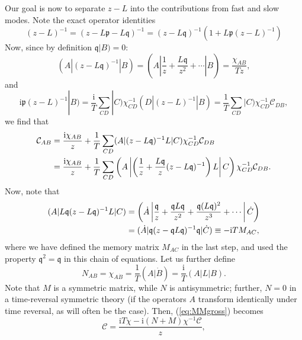 \documentclass[10pt, oneside]{book}
\begin{document}
\begin{doublespace}
Our goal is now to separate $z-L$ into the contributions from fast and slow modes.   Note the exact operator identities \begin{equation}
(z-L)^{-1} = (z-L\mathfrak{p}-L\mathfrak{q})^{-1} = (z-L\mathfrak{q})^{-1}\left(1 + L\mathfrak{p}(z-L)^{-1}\right)
\end{equation}
Now, since by definition $\mathfrak{q}|B)=0$: \begin{equation}
(A|(z-L\mathfrak{q})^{-1}|B) = \left(A\left|\frac{1}{z} + \frac{L\mathfrak{q}}{z^2} + \cdots \right|B\right) = \frac{\chi_{AB}}{Tz},
\end{equation}
and \begin{equation}
\mathrm{i}\mathfrak{p}(z-L)^{-1}|B) = \frac{\mathrm{i}}{T}\sum_{CD}|C)\chi^{-1}_{CD}(D|(z-L)^{-1}|B) =  \frac{1}{T}\sum_{CD} |C) \chi^{-1}_{CD}\mathcal{C}_{DB},
\end{equation}we find that \begin{align}
\mathcal{C}_{AB} &= \frac{\mathrm{i}\chi_{AB}}{z} + \frac{1}{T}\sum_{CD} (A|(z-L\mathfrak{q})^{-1} L |C)\chi^{-1}_{CD}\mathcal{C}_{DB} \notag \\
&= \frac{\mathrm{i}\chi_{AB}}{z} + \frac{1}{T} \sum_{CD}  \left(A \left| \left(\frac{1}{z} + \frac{L\mathfrak{q}}{z}(z-L\mathfrak{q})^{-1}\right) L \right|C\right) \chi^{-1}_{CD}\mathcal{C}_{DB}. \label{eq:MMgross}
\end{align}
Now, note that \begin{align}
(A| L\mathfrak{q}(z-L\mathfrak{q})^{-1}L|C) &= \left(\dot{A} \left| \frac{\mathfrak{q}}{z} + \frac{\mathfrak{q}L\mathfrak{q}}{z^2} + \frac{\mathfrak{q}(L\mathfrak{q})^2}{z^3}+\cdots\right|\dot C\right) \notag \\
 &= (\dot{A}|\mathfrak{q}(z-\mathfrak{q}L\mathfrak{q})^{-1}\mathfrak{q}|\dot C) \equiv -\mathrm{i}TM_{AC},  \label{eq:memform3}
\end{align}
where we have defined the memory matrix $M_{AC}$ in the last step, and used the property $\mathfrak{q}^2=\mathfrak{q}$ in this chain of equations.
Let us further define\begin{equation}
N_{AB} = \chi_{A\dot{B}} = \frac{1}{T}(A|\dot{B}) = \frac{\mathrm{i}}{T}(A|L|B).
\end{equation}
Note that $M$ is a symmetric matrix, while $N$ is antisymmetric;  further, $N=0$ in a time-reversal symmetric theory (if the operators $A$ transform identically under time reversal, as will often be the case).  Then, (\ref{eq:MMgross}) becomes \begin{equation}
 \mathcal{C}=\frac{\mathrm{i}T\chi - \mathrm{i}(N+M)\chi^{-1}\mathcal{C}}{z},

\end{equation}
\end{doublespace}
\end{document}
